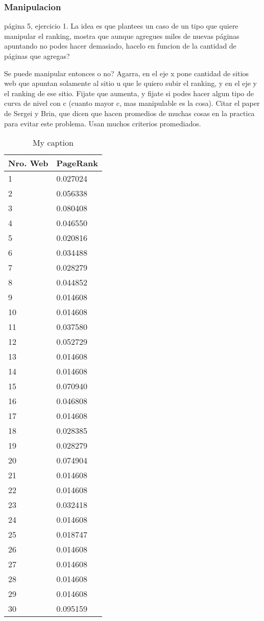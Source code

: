 \subsubsection{Manipulacion}
página 5, ejercicio 1. La idea es que plantees un caso de un tipo que quiere manipular el ranking, mostra que aunque agregues miles de nuevas páginas apuntando no podes hacer demasiado, hacelo en funcion de la cantidad de páginas que agregas?

Se puede manipular entonces o no? Agarra, en el eje x pone cantidad de sitios web que apuntan solamente al sitio u que le quiero subir el ranking, y en el eje y el ranking de ese sitio. Fijate que aumenta, y fijate si podes hacer algun tipo de curva de nivel con c (cuanto mayor c, mas manipulable es la cosa). Citar el paper de Sergei y Brin, que dicen que hacen promedios de muchas cosas en la practica para evitar este problema. Usan muchos criterios promediados.

\begin{table}[]
\centering
\caption{My caption}
\label{my-label}
\begin{tabular}{ll}
\hline
Nro. Web & PageRank \\ \hline
1        & 0.027024 \\
2        & 0.056338 \\
3        & 0.080408 \\
4        & 0.046550 \\
5        & 0.020816 \\
6        & 0.034488 \\
7        & 0.028279 \\
8        & 0.044852 \\
9        & 0.014608 \\
10       & 0.014608 \\
11       & 0.037580 \\
12       & 0.052729 \\
13       & 0.014608 \\
14       & 0.014608 \\
15       & 0.070940 \\
16       & 0.046808 \\
17       & 0.014608 \\
18       & 0.028385 \\
19       & 0.028279 \\
20       & 0.074904 \\
21       & 0.014608 \\
22       & 0.014608 \\
23       & 0.032418 \\
24       & 0.014608 \\
25       & 0.018747 \\
26       & 0.014608 \\
27       & 0.014608 \\
28       & 0.014608 \\
29       & 0.014608 \\
30       & 0.095159 \\ \hline
\end{tabular}
\end{table}

